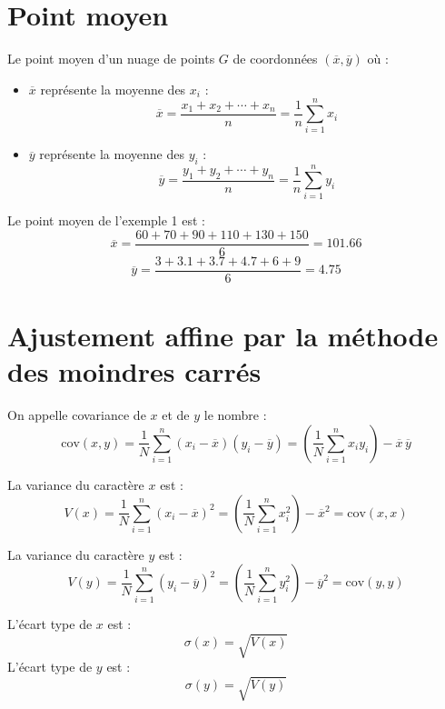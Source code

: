 \documentclass[11pt]{article}
\begin{document}
\section{Point moyen}

\begin{definition}
Le point moyen d’un nuage de points $G$ de coordonnées $(\overline{x}, \overline{y})$ où :
\begin{itemize}
    \item $\overline{x}$ représente la moyenne des $x_i$ :
    \[
    \overline{x} = \frac{x_1 + x_2 + \cdots + x_n}{n} = \frac{1}{n} \sum_{i=1}^{n} x_i
    \]
    \item $\overline{y}$ représente la moyenne des $y_i$ :
    \[
    \overline{y} = \frac{y_1 + y_2 + \cdots + y_n}{n} = \frac{1}{n} \sum_{i=1}^{n} y_i
    \]
\end{itemize}
\end{definition}

\begin{exemple}
Le point moyen de l'exemple 1 est :
\[
\overline{x} = \frac{60 + 70 + 90 + 110 + 130 + 150}{6} = 101.66
\]
\[
\overline{y} = \frac{3 + 3.1 + 3.7 + 4.7 + 6 + 9}{6} = 4.75
\]
\end{exemple}
\section{Ajustement affine par la méthode des moindres carrés}

\begin{definition}
On appelle covariance de $x$ et de $y$ le nombre :
\[
\text{cov}(x, y) = \frac{1}{N} \sum_{i=1}^{n} (x_i - \overline{x})(y_i - \overline{y}) = \left( \frac{1}{N} \sum_{i=1}^{n} x_i y_i \right) - \overline{x} \, \overline{y}
\]
\end{definition}

\begin{definition}
La variance du caractère $x$ est :
\[
V(x) = \frac{1}{N} \sum_{i=1}^{n} (x_i - \overline{x})^2 = \left( \frac{1}{N} \sum_{i=1}^{n} x_i^2 \right) - \overline{x}^2 = \text{cov}(x, x)
\]
\end{definition}

\begin{definition}
La variance du caractère $y$ est :
\[
V(y) = \frac{1}{N} \sum_{i=1}^{n} (y_i - \overline{y})^2 = \left( \frac{1}{N} \sum_{i=1}^{n} y_i^2 \right) - \overline{y}^2 = \text{cov}(y, y)
\]
\end{definition}

\begin{definition}
L'écart type de $x$ est :
\[
\sigma(x) = \sqrt{V(x)}
\]
L'écart type de $y$ est :
\[
\sigma(y) = \sqrt{V(y)}
\]
\end{definition}
\end{document}

